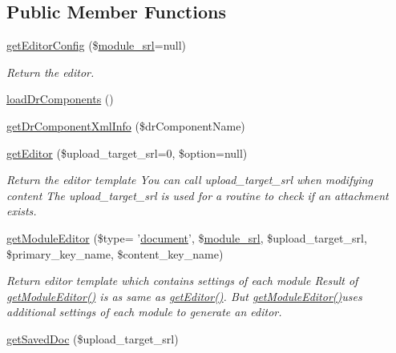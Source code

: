 \subsection*{Public Member Functions}
\begin{DoxyCompactItemize}
\item 
\hyperlink{classeditorModel_a66f732bbdd500d31fb39fd03eb8d46b5}{get\-Editor\-Config} (\$\hyperlink{ko_8install_8php_a370bb6450fab1da3e0ed9f484a38b761}{module\-\_\-srl}=null)
\begin{DoxyCompactList}\small\item\em Return the editor. \end{DoxyCompactList}\item 
\hyperlink{classeditorModel_a1ad866d4c1ab454b9d0b72c8d3cc29bd}{load\-Dr\-Components} ()
\item 
\hyperlink{classeditorModel_a580e31ed0fff869a97d5fe598975e960}{get\-Dr\-Component\-Xml\-Info} (\$dr\-Component\-Name)
\item 
\hyperlink{classeditorModel_a77477c0a6d333b3230f77904d96d93c5}{get\-Editor} (\$upload\-\_\-target\-\_\-srl=0, \$option=null)
\begin{DoxyCompactList}\small\item\em Return the editor template You can call upload\-\_\-target\-\_\-srl when modifying content The upload\-\_\-target\-\_\-srl is used for a routine to check if an attachment exists. \end{DoxyCompactList}\item 
\hyperlink{classeditorModel_a7870d2a76cbc33a9dbaea3f865edd313}{get\-Module\-Editor} (\$type= '\hyperlink{classdocument}{document}', \$\hyperlink{ko_8install_8php_a370bb6450fab1da3e0ed9f484a38b761}{module\-\_\-srl}, \$upload\-\_\-target\-\_\-srl, \$primary\-\_\-key\-\_\-name, \$content\-\_\-key\-\_\-name)
\begin{DoxyCompactList}\small\item\em Return editor template which contains settings of each module Result of \hyperlink{classeditorModel_a7870d2a76cbc33a9dbaea3f865edd313}{get\-Module\-Editor()} is as same as \hyperlink{classeditorModel_a77477c0a6d333b3230f77904d96d93c5}{get\-Editor()}. But \hyperlink{classeditorModel_a7870d2a76cbc33a9dbaea3f865edd313}{get\-Module\-Editor()}uses additional settings of each module to generate an editor. \end{DoxyCompactList}\item 
\hyperlink{classeditorModel_af9c4c2f7ba2d377b087cac08412b0baa}{get\-Saved\-Doc} (\$upload\-\_\-target\-\_\-srl)

\end{DoxyCompactItemize}
